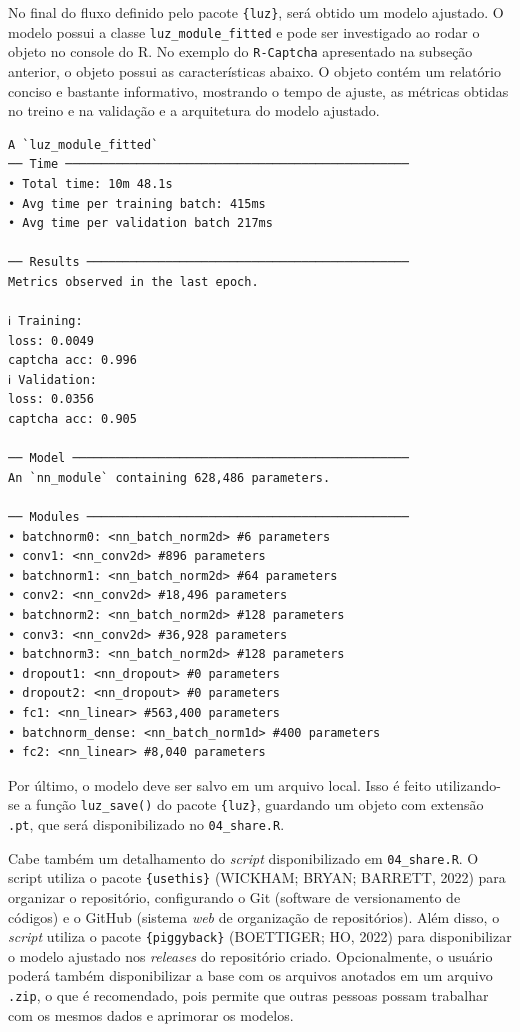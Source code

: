 \documentclass[12pt,twoside,brazilian]{book}
\begin{document}
No final do fluxo definido pelo pacote \texttt{\{luz\}}, será obtido um
modelo ajustado. O modelo possui a classe \texttt{luz\_module\_fitted} e
pode ser investigado ao rodar o objeto no console do R. No exemplo do
\texttt{R-Captcha} apresentado na subseção anterior, o objeto possui as
características abaixo. O objeto contém um relatório conciso e bastante
informativo, mostrando o tempo de ajuste, as métricas obtidas no treino
e na validação e a arquitetura do modelo ajustado.

\begin{verbatim}
A `luz_module_fitted`
── Time ────────────────────────────────────────────────
• Total time: 10m 48.1s
• Avg time per training batch: 415ms
• Avg time per validation batch 217ms

── Results ─────────────────────────────────────────────
Metrics observed in the last epoch.

ℹ Training:
loss: 0.0049
captcha acc: 0.996
ℹ Validation:
loss: 0.0356
captcha acc: 0.905

── Model ───────────────────────────────────────────────
An `nn_module` containing 628,486 parameters.

── Modules ─────────────────────────────────────────────
• batchnorm0: <nn_batch_norm2d> #6 parameters
• conv1: <nn_conv2d> #896 parameters
• batchnorm1: <nn_batch_norm2d> #64 parameters
• conv2: <nn_conv2d> #18,496 parameters
• batchnorm2: <nn_batch_norm2d> #128 parameters
• conv3: <nn_conv2d> #36,928 parameters
• batchnorm3: <nn_batch_norm2d> #128 parameters
• dropout1: <nn_dropout> #0 parameters
• dropout2: <nn_dropout> #0 parameters
• fc1: <nn_linear> #563,400 parameters
• batchnorm_dense: <nn_batch_norm1d> #400 parameters
• fc2: <nn_linear> #8,040 parameters
\end{verbatim}

Por último, o modelo deve ser salvo em um arquivo local. Isso é feito
utilizando-se a função \texttt{luz\_save()} do pacote \texttt{\{luz\}},
guardando um objeto com extensão \texttt{.pt}, que será disponibilizado
no \texttt{04\_share.R}.

Cabe também um detalhamento do \emph{script} disponibilizado em
\texttt{04\_share.R}. O script utiliza o pacote \texttt{\{usethis\}}
(WICKHAM; BRYAN; BARRETT, 2022) para organizar o repositório,
configurando o Git (software de versionamento de códigos) e o GitHub
(sistema \emph{web} de organização de repositórios). Além disso, o
\emph{script} utiliza o pacote \texttt{\{piggyback\}} (BOETTIGER; HO,
2022) para disponibilizar o modelo ajustado nos \emph{releases} do
repositório criado. Opcionalmente, o usuário poderá também
disponibilizar a base com os arquivos anotados em um arquivo
\texttt{.zip}, o que é recomendado, pois permite que outras pessoas
possam trabalhar com os mesmos dados e aprimorar os modelos.
\end{document}
